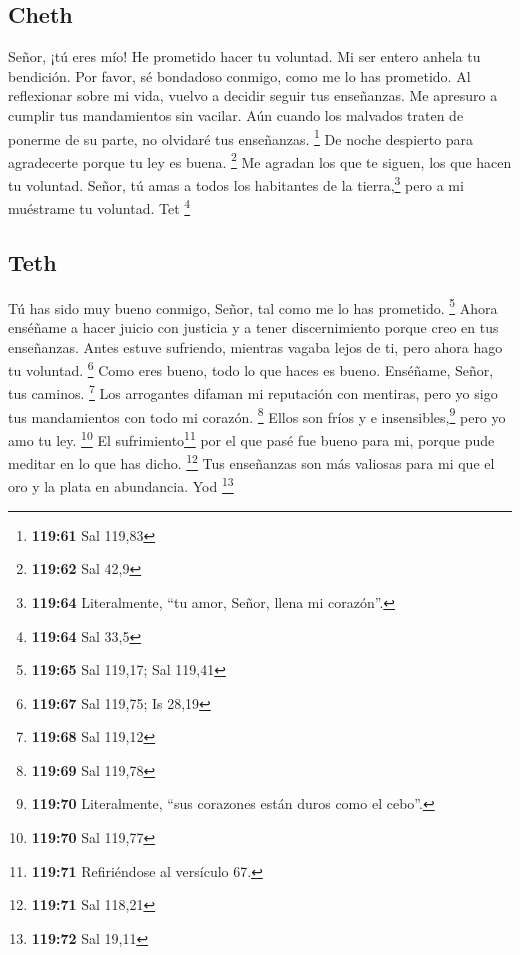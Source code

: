 \hypertarget{cheth}{%
\subsection{Cheth}\label{cheth}}

 Señor, ¡tú eres mío! He prometido hacer tu voluntad.
 Mi ser entero anhela tu bendición. Por favor, sé
bondadoso conmigo, como me lo has prometido.  Al
reflexionar sobre mi vida, vuelvo a decidir seguir tus enseñanzas.
 Me apresuro a cumplir tus mandamientos sin vacilar.
 Aún cuando los malvados traten de ponerme de su parte,
no olvidaré tus enseñanzas. \footnote{\textbf{119:61} Sal 119,83}
 De noche despierto para agradecerte porque tu ley es
buena. \footnote{\textbf{119:62} Sal 42,9}  Me agradan
los que te siguen, los que hacen tu voluntad.  Señor, tú
amas a todos los habitantes de la tierra,\footnote{\textbf{119:64}
  Literalmente, ``tu amor, Señor, llena mi corazón''.} pero a mi
muéstrame tu voluntad. Tet \footnote{\textbf{119:64} Sal 33,5}

\hypertarget{teth}{%
\subsection{Teth}\label{teth}}

 Tú has sido muy bueno conmigo, Señor, tal como me lo has
prometido. \footnote{\textbf{119:65} Sal 119,17; Sal 119,41}
 Ahora enséñame a hacer juicio con justicia y a tener
discernimiento porque creo en tus enseñanzas.  Antes
estuve sufriendo, mientras vagaba lejos de ti, pero ahora hago tu
voluntad. \footnote{\textbf{119:67} Sal 119,75; Is 28,19}
 Como eres bueno, todo lo que haces es bueno. Enséñame,
Señor, tus caminos. \footnote{\textbf{119:68} Sal 119,12}
 Los arrogantes difaman mi reputación con mentiras, pero
yo sigo tus mandamientos con todo mi corazón. \footnote{\textbf{119:69}
  Sal 119,78}  Ellos son fríos y e
insensibles,\footnote{\textbf{119:70} Literalmente, ``sus corazones
  están duros como el cebo''.} pero yo amo tu ley. \footnote{\textbf{119:70}
  Sal 119,77}  El sufrimiento\footnote{\textbf{119:71}
  Refiriéndose al versículo 67.} por el que pasé fue bueno para mi,
porque pude meditar en lo que has dicho. \footnote{\textbf{119:71} Sal
  118,21}  Tus enseñanzas son más valiosas para mi que el
oro y la plata en abundancia. Yod \footnote{\textbf{119:72} Sal 19,11}

